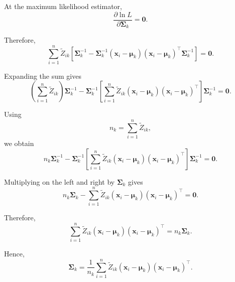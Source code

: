 At the maximum likelihood estimator,
\begin{equation*}
\frac{\partial\ln L}
{\partial\boldsymbol{\Sigma}_k}
=
\boldsymbol{0}.
\end{equation*}

Therefore,
\begin{equation*}
\sum_{i=1}^n
\tilde{Z}_{ik}
\left[
\boldsymbol{\Sigma}_k^{-1}
-
\boldsymbol{\Sigma}_k^{-1}
(\boldsymbol{x}_i-\boldsymbol{\mu}_k)
(\boldsymbol{x}_i-\boldsymbol{\mu}_k)^\top
\boldsymbol{\Sigma}_k^{-1}
\right]
=
\boldsymbol{0}.
\end{equation*}

Expanding the sum gives
\begin{equation*}
\left(
\sum_{i=1}^n\tilde{Z}_{ik}
\right)
\boldsymbol{\Sigma}_k^{-1}
-
\boldsymbol{\Sigma}_k^{-1}
\left[
\sum_{i=1}^n
\tilde{Z}_{ik}
(\boldsymbol{x}_i-\boldsymbol{\mu}_k)
(\boldsymbol{x}_i-\boldsymbol{\mu}_k)^\top
\right]
\boldsymbol{\Sigma}_k^{-1}
=
\boldsymbol{0}.
\end{equation*}

Using
\begin{equation*}
n_k=\sum_{i=1}^n\tilde{Z}_{ik},
\end{equation*}
we obtain
\begin{equation*}
n_k\boldsymbol{\Sigma}_k^{-1}
-
\boldsymbol{\Sigma}_k^{-1}
\left[
\sum_{i=1}^n
\tilde{Z}_{ik}
(\boldsymbol{x}_i-\boldsymbol{\mu}_k)
(\boldsymbol{x}_i-\boldsymbol{\mu}_k)^\top
\right]
\boldsymbol{\Sigma}_k^{-1}
=
\boldsymbol{0}.
\end{equation*}

Multiplying on the left and right by
$\boldsymbol{\Sigma}_k$ gives
\begin{equation*}
n_k\boldsymbol{\Sigma}_k
-
\sum_{i=1}^n
\tilde{Z}_{ik}
(\boldsymbol{x}_i-\boldsymbol{\mu}_k)
(\boldsymbol{x}_i-\boldsymbol{\mu}_k)^\top
=
\boldsymbol{0}.
\end{equation*}

Therefore,
\begin{equation*}
\sum_{i=1}^n
\tilde{Z}_{ik}
(\boldsymbol{x}_i-\boldsymbol{\mu}_k)
(\boldsymbol{x}_i-\boldsymbol{\mu}_k)^\top
=
n_k\boldsymbol{\Sigma}_k.
\end{equation*}

Hence,
\begin{equation*}
\boldsymbol{\Sigma}_k
=
\frac{1}{n_k}
\sum_{i=1}^n
\tilde{Z}_{ik}
(\boldsymbol{x}_i-\boldsymbol{\mu}_k)
(\boldsymbol{x}_i-\boldsymbol{\mu}_k)^\top.
\end{equation*}

